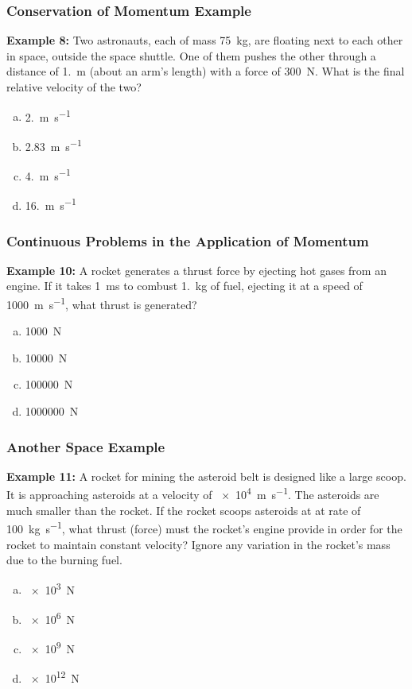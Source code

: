 \documentclass[12pt,compress,aspectratio=169]{beamer}
\begin{document}
\begin{frame}
  \frametitle{Conservation of Momentum Example}
  \textbf{Example 8:} Two astronauts, each of mass \SI{75}{\kilo\gram}, are
  floating next to each other in space, outside the space shuttle. One of them
  pushes the other through a distance of \SI{1.}{\metre} (about an arm's
  length) with a force of \SI{300}{\newton}. What is the final relative
  velocity of the two?
  \begin{enumerate}[(a)]
  \item \SI{2.}{\metre\per\second}
  \item \SI{2.83}{\metre\per\second}
  \item \SI{4.}{\metre\per\second}
  \item \SI{16.}{\metre\per\second}
  \end{enumerate}
\end{frame}

\begin{frame}
  \frametitle{Continuous Problems in the Application of Momentum}

%
  \textbf{Example 10:} A rocket generates a thrust force by ejecting hot gases
  from an engine. If it takes \SI{1}{\milli\second} to combust
  \SI{1.}{\kilo\gram} of fuel, ejecting it at a speed of
  \SI{1000}{\metre\per\second}, what thrust is generated?
  \begin{enumerate}[(a)]
  \item \SI{1000}{\newton}
  \item \SI{10000}{\newton}
  \item \SI{100000}{\newton}
  \item \SI{1000000}{\newton}
  \end{enumerate}
\end{frame}

\begin{frame}
  \frametitle{Another Space Example}
  \textbf{Example 11:} A rocket for mining the asteroid belt is designed like a
  large scoop. It is approaching asteroids at a velocity of
  \SI{e4}{\metre\per\second}. The asteroids are much smaller than the rocket.
  If the rocket scoops asteroids at at rate of \SI{100}{\kilo\gram\per\second},
  what thrust (force) must the rocket's engine provide in order for the rocket
  to maintain constant velocity? Ignore any variation in the rocket's mass due
  to the burning fuel.
  \begin{enumerate}[(a)]
  \item \SI{e3}{\newton}
  \item \SI{e6}{\newton}
  \item \SI{e9}{\newton}
  \item \SI{e12}{\newton}
  \end{enumerate}
\end{frame}
\end{document}
